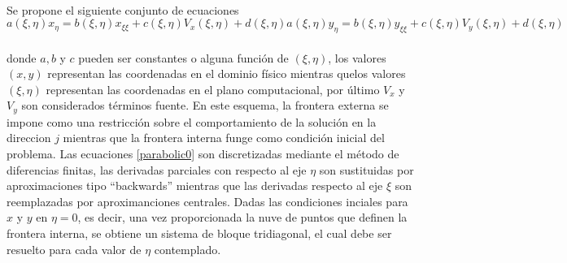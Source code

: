 \documentclass[letterpaper, openright, 12pt]{book}
\begin{document}
    \paragraph*{}
        Se propone el siguiente conjunto de ecuaciones
        \begin{subequations}
            \begin{equation}
                a(\xi, \eta) x_\eta = b(\xi, \eta)x_{\xi\xi} + c(\xi, \eta)V_x(\xi, \eta) + d(\xi, \eta)
            \end{equation}
            \begin{equation}
                a(\xi, \eta) y_\eta = b(\xi, \eta)y_{\xi\xi} + c(\xi, \eta)V_y(\xi, \eta) + d(\xi, \eta)
            \end{equation}
            \label{parabolic0}
        \end{subequations}\\
        donde $a, b$ y $c$ pueden ser constantes o alguna función de
        $(\xi,\eta)$, los valores $(x, y)$ representan las coordenadas en el
        dominio físico mientras quelos valores $(\xi, \eta)$ representan las
        coordenadas en el plano computacional, por último $V_x$ y $V_y$ son
        considerados términos fuente. En este esquema, la frontera externa se
        impone como una restricción sobre el comportamiento de la solución en la
        direccion $j$ mientras que la frontera interna funge como condición
        inicial del problema. Las ecuaciones \ref{parabolic0} son discretizadas
        mediante el método de diferencias finitas, las derivadas parciales con
        respecto al eje $\eta$ son sustituidas por aproximaciones tipo
        ``backwards'' mientras que las derivadas respecto al eje $\xi$ son
        reemplazadas por aproximanciones centrales. Dadas las condiciones
        inciales para $x$  y $y$ en $\eta = 0$, es decir, una vez proporcionada
        la nuve de puntos que definen la frontera interna, se obtiene un sistema
        de bloque tridiagonal, el cual debe ser resuelto para cada valor de
        $\eta$ contemplado.
\end{document}
